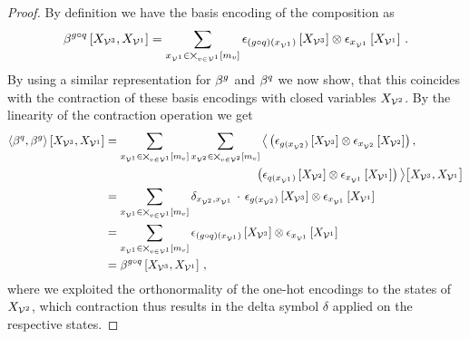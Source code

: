 \begin{proof}
    By definition we have the basis encoding of the composition as
    \begin{align*}
        \beta^{{g}\circ{q}}\left[X_{\mathcal{V}^{3}},X_{\mathcal{V}^{1}}\right]
        = \sum_{x_{\mathcal{V}^{1}}\in\bigtimes_{v\in\mathcal{V}^{1}}[m_{v}]}
        \epsilon_{({g}\circ{q})(x_{\mathcal{V}^{1}})}\left[X_{\mathcal{V}^{3}}\right] \otimes
        \epsilon_{x_{\mathcal{V}^{1}}}\left[X_{\mathcal{V}^{1}}\right]  \, .
    \end{align*}
    By using a similar representation for $\beta^{g}$ and $\beta^{q}$ we now show, that this coincides with the contraction of these basis encodings with closed variables $X_{\mathcal{V}^{2}}$.
    By the linearity of the contraction operation we get
    \begin{align*}
        \contractionof{\bencodingof{\exfunction},\bencodingof{\secexfunction}}{\catvariableof{\nodesthree},\catvariableof{\nodesone}}
        & = \sum_{\catindexof{\nodesone}\in\bigtimes_{\node\in\nodesone}[\catdimof{\node}]}
        \sum_{\catindexof{\nodestwo} \in \bigtimes_{\node\in\nodestwo}[\catdimof{\node}]}
        \breakablecontractionof{
            \left( \onehotmapofat{\secexfunctionat{\catindexof{\nodestwo}}}{\catvariableof{\nodesthree}} \otimes
            \onehotmapofat{\catindexof{\nodestwo}}{\catvariableof{\nodestwo}} \right), \\
            & \hspace{4.5cm} \left( \onehotmapofat{\exfunctionat{\catindexof{\nodesone}}}{\catvariableof{\nodestwo}} \otimes
            \onehotmapofat{\catindexof{\nodesone}}{\catvariableof{\nodesone}} \right)
        }{\catvariableof{\nodesthree},\catvariableof{\nodesone}} \\
        & = \sum_{\catindexof{\nodesone}\in\bigtimes_{\node\in\nodesone}[\catdimof{\node}]}
        \delta_{\catindexof{\nodestwo},\catindexof{\nodesone}} \, \cdot \,
        \onehotmapofat{\secexfunctionat{\catindexof{\nodestwo}}}{\catvariableof{\nodesthree}} \otimes
        \onehotmapofat{\catindexof{\nodesone}}{\catvariableof{\nodesone}} \\
        & = \sum_{\catindexof{\nodesone}\in\nodestatesof{\nodesone}}
        \onehotmapofat{\compositionofat{\secexfunction}{\exfunction}{\catindexof{\nodesone}}}{\catvariableof{\nodesthree}} \otimes
        \onehotmapofat{\catindexof{\nodesone}}{\catvariableof{\nodesone}} \\
        & = \bencodingofat{\compositionof{\secexfunction}{\exfunction}}{\catvariableof{\nodesthree},\catvariableof{\nodesone}} \, ,
    \end{align*}
    where we exploited the orthonormality of the one-hot encodings to the states of $X_{\mathcal{V}^{2}}$, which contraction thus results in the delta symbol $\delta$ applied on the respective states.
\end{proof}

